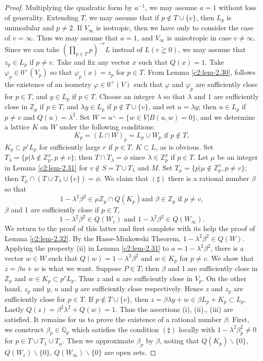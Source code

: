 \begin{proof}
Multiplying the quadratic form by $a^{-1}$, we may assume $a=1$
without loss of generality. Extending $T$, we may assume that if
$p\not\in T \cup \{v\}$, then $L_p$ is unimodular and $p\neq 2$. If
$V_{\infty}$ is isotropic, then we have only to consider the case of
$v=\infty$. Thus we may assume that $a=1$, and $V_{\infty}$ is
anisotropic in case $v\neq \infty$. Since we can take
$(\prod\limits_{p\in T}p)^{-r}L$ instead of $L(r\geqq 0)$, we
may assume that $z_p \in L_p$ if $p\neq v$. Take and fix any
vector $x$ such that $Q(x)=1$. Take $\varphi_p\in 0^+(V_p)$ so
that $\varphi_p(x)=z_p$ for $p\in T$. From Lemma \ref{c2:lem-2.30}, follows
the existence of an isometry $\varphi \in 0^+(V)$ such that
$\varphi$ and $\varphi_p$ are sufficiently close for $p\in T$,
and $y\in L_p$ if $p\in T$. Choose an integer
$\lambda$ so that $\lambda$ and 1 are sufficiently close in
$\mathbb{Z}_p$ if $p\in T$, and $\lambda y \in L_p$ if
$p \not\in T \cup\{v\}$, and set $u=\lambda y$; then $u\in
L_p$ if $p\neq v$ and $Q(u)=\lambda^2$. Set $W=u^{\perp} = \{
w\in V|B(u,w)=0\}$, and we determine a lattice $K$ on $W$
under the following conditions:
$$
K_p = (L\cap W)_p = L_p \cup W_p \text{ if } p \not\in T,
$$
$K_p \subset p^r L_p$ for sufficiently large $r$ if $p\in
T$. $K\subset L$, as is obvious. Set\pageoriginale
$T_{\lambda}=\{p| \lambda \not\in \mathbb{Z}^x_p, p\neq v\}$; then
$T\cap T_{\lambda}=\phi$ since $\lambda \in \mathbb{Z}^x_p$ if
$p\in T$. Let $\mu$ be an integer in Lemma \ref{c2:lem-2.31} for $v\not\in
S=T\cup T_{\lambda}$ and $M$. Set
$T_{\mu}=\{p|\mu \not\in \mathbb{Z}^x_p, p \neq v\}$; then
$T_{\mu} \cap (T\cup T_{\lambda} \cup\{v\})=\phi$. We claim that
$(\sharp)$ there is a rational number $\beta$ so that
$$
1-\lambda^2 \beta^2 \in \mu \mathbb{Z}_p \cap Q (K_p) \text{
and } \beta \in \mathbb{Z}_p \text{ if } p \neq v,
$$
$\beta$ and 1 are sufficiently close if $p\in T$,
$$
1-\lambda^2 \beta^2 \in Q(W_v) \text{ and }
1-\lambda^2 \beta^2 \in Q(W_{\infty}).
$$
We return to the proof of this latter and first complete with its help
the proof of Lemma \ref{c2:lem-2.32}. By the Hasse-Minkowski Theorem,
$1-\lambda^2 \beta^2 \in Q(W)$. Applying the property (ii) in
Lemma \ref{c2:lem-2.31} to $a=1-\lambda^2\beta^2$, there is a vector $w\in
W$ such that $Q(w)=1-\lambda^2\beta^2$ and $w\in K_p$ for
$p\neq v$. We show that $z=\beta u + w$ is what we want. Suppose
$P\in T$; then $\beta$ and 1 are sufficiently close in
$\mathbb{Z}_p$ and $w\in K_p \subset p^r L_p$. Thus $z$ and
$u$ are sufficiently close in $V_p$. On the other hand, $z_p$ and $y$,
$u$ and $y$ are sufficiently close respectively. Hence $z$ and $z_p$
are sufficiently close for $p\in T$. If $p\not\in
T\cup \{v\}$, then $z=\beta\lambda y + w \in \beta L_p +
K_p \subset L_p$. Lastly $Q(z)=\beta^2\lambda^2+Q(w)=1$. Thus the
assertions (i), (ii)., (iii) are satisfied. It remains for us to prove
the existence of a rational number $\beta$. First, we construct
$\beta_p\in \mathbb{Q}_p$ which satisfies the condition
$(\sharp)$ locally with $1-\lambda^2\beta^2_p\neq 0$ for $p\in
T \cup T_{\lambda} \cup T_{\mu}$. Then we approximate $\beta_p$ by
$\beta$, noting that $Q(K_p)\backslash\{0\}$, $Q(W_v)\backslash\{0\}$,
$Q(W_{\infty})\backslash\{0\}$ are open sets.


\end{proof}
